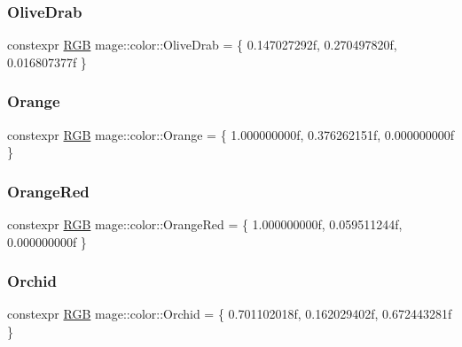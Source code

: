 \hypertarget{namespacemage_1_1color_af64e33355edbb29b2b6200bc3a4dbe17}{}\label{namespacemage_1_1color_af64e33355edbb29b2b6200bc3a4dbe17} 
\subsubsection{\texorpdfstring{Olive\+Drab}{OliveDrab}}
{\footnotesize\ttfamily constexpr \hyperlink{structmage_1_1_r_g_b}{R\+GB} mage\+::color\+::\+Olive\+Drab = \{ 0.\+147027292f, 0.\+270497820f, 0.\+016807377f \}}

\hypertarget{namespacemage_1_1color_ac29b4832f097eea80e4a07c4b4075ce6}{}\label{namespacemage_1_1color_ac29b4832f097eea80e4a07c4b4075ce6} 
\subsubsection{\texorpdfstring{Orange}{Orange}}
{\footnotesize\ttfamily constexpr \hyperlink{structmage_1_1_r_g_b}{R\+GB} mage\+::color\+::\+Orange = \{ 1.\+000000000f, 0.\+376262151f, 0.\+000000000f \}}

\hypertarget{namespacemage_1_1color_a7aa807153f37477c187dac3d059b7f83}{}\label{namespacemage_1_1color_a7aa807153f37477c187dac3d059b7f83} 
\subsubsection{\texorpdfstring{Orange\+Red}{OrangeRed}}
{\footnotesize\ttfamily constexpr \hyperlink{structmage_1_1_r_g_b}{R\+GB} mage\+::color\+::\+Orange\+Red = \{ 1.\+000000000f, 0.\+059511244f, 0.\+000000000f \}}

\hypertarget{namespacemage_1_1color_a1659e10d131af787628e24db095a5c58}{}\label{namespacemage_1_1color_a1659e10d131af787628e24db095a5c58} 
\subsubsection{\texorpdfstring{Orchid}{Orchid}}
{\footnotesize\ttfamily constexpr \hyperlink{structmage_1_1_r_g_b}{R\+GB} mage\+::color\+::\+Orchid = \{ 0.\+701102018f, 0.\+162029402f, 0.\+672443281f \}}

